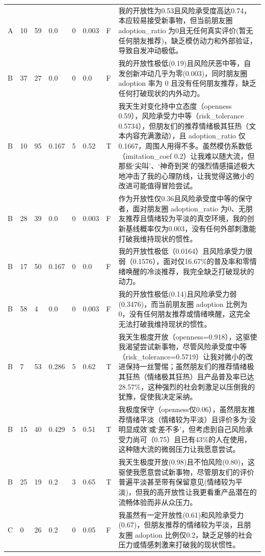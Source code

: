 \begin{longtable}{P{0.05\textwidth}P{0.05\textwidth}P{0.07\textwidth}P{0.08\textwidth}P{0.06\textwidth}P{0.06\textwidth}P{0.06\textwidth}P{0.45\textwidth}}
A & 10 & 59 & 0.0 & 0 & 0.003 & F & 我的开放性为0.53且风险承受度高达0.74，本应较易接受新事物，但当前朋友圈 adoption\_ratio 为0且无任何真实评价(暂无任何朋友推荐)，缺乏模仿动力和外部验证，导致自发冲动极低。 \\
B & 37 & 27 & 0.0 & 0 & 0.0 & F & 我的开放性极低(0.19)且风险厌恶中等，自发创新冲动几乎为零(0.003)，同时朋友圈 adoption 率为 0 且没有任何朋友推荐，缺乏任何打破现状的内外动力。 \\
B & 10 & 95 & 0.167 & 5 & 0.52 & T & 我天生对变化持中立态度（openness 0.59），风险承受力中等（risk\_tolerance 0.5734），但朋友们的推荐情绪极其狂热（文本内容充满激动），且 adoption\_ratio 仅 0.1667，周围人用得不多。虽然模仿系数低（imitation\_coef 0.2）让我难以随大流，但那些‘尖叫’、‘神奇到哭’的强烈情感描述极大地冲击了我的心理防线，让我觉得这微小的改进可能值得冒险尝试。 \\
B & 28 & 39 & 0.0 & 0 & 0.003 & F & 作为开放性仅0.36且风险承受度中等的保守者，面对朋友圈 adoption\_ratio 为0、无朋友推荐且情绪较为平淡的真空环境，我的创新基线概率仅为0.003，没有任何外部刺激能打破我维持现状的惯性。 \\
B & 17 & 50 & 0.167 & 0 & 0.0 & F & 我的开放性极低（0.0164）且风险承受力很弱（0.1576），面对仅16.67\%的普及率和零情绪唤醒的冷淡推荐，我完全缺乏打破现状的动力。 \\
B & 58 & 4 & 0.0 & 0 & 0.003 & F & 我的开放性极低(0.14)且风险承受力弱(0.3476)，而当前朋友圈 adoption 比例为 0，没有任何朋友推荐或情绪唤醒，这完全无法打破我维持现状的惯性。 \\
B & 7 & 53 & 0.286 & 5 & 0.62 & T & 我天生极度开放（openness=0.918），这驱使我渴望尝试新事物，尽管风险承受度中等（risk\_tolerance=0.5719）让我对微小的改进保持一丝警惕；虽然朋友们的推荐情绪极其狂热（情绪极其狂热）且产品普及率已达28.57\%，这种强烈的社会刺激足以压倒我的犹豫，促使我决定采纳。 \\
B & 15 & 40 & 0.429 & 5 & 0.51 & T & 我极度保守（openness仅0.06），虽然朋友推荐情绪平淡（情绪较为平淡）且评价多为‘没明显成效’或‘差不多’，但考虑到自己风险承受力尚可（0.75）且已有43\%的人在使用，这种随大流的微弱压力让我愿意尝试。 \\
B & 25 & 19 & 0.2 & 3 & 0.65 & T & 我天生极度开放(0.98)且不怕风险(0.80)，这驱使我愿意尝试新事物，尽管朋友们的评价普遍平淡甚至带有保留意见(情绪较为平淡)，但我的高开放性让我更看重产品潜在的流畅体验而非从众压力。 \\
C & 0 & 26 & 0.2 & 0 & 0.05 & F & 我虽然有一定开放性(0.61)和风险承受力(0.67)，但朋友推荐的情绪较为平淡，且朋友圈 adoption 比例仅0.2，缺乏足够的社会压力或情感刺激来打破我的现状惯性。 \\

\end{longtable}
